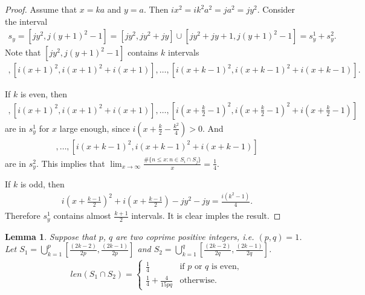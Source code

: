 \documentclass[a4paper,10pt]{amsart}
\newtheorem{lemma}{Lemma}[section]
\begin{document}
\begin{proof}
   Assume that $x = ka$ and $y = a$. Then $ix^2 = ik^2 a^2 = ja^2 = jy^2$. 
   Consider the interval 
   \begin{align*}
        s_y = [jy^2, j(y+1)^2 -1] = [jy^2, jy^2 + jy] 
        \cup [jy^2 + jy + 1, j(y+1)^2 -1] = s_{y}^{1} + s_{y}^{2}.   
   \end{align*} 
   Note that $[jy^2, j(y+1)^2-1]$ contains $k$ intervals
   \begin{align*}
       [ix^2, ix^2+ix], [i(x+1)^2, i(x+1)^2 + i(x+1)], \ldots, 
       [i(x+k-1)^2, i(x+k -1)^2+ i(x+ k-1)].
   \end{align*}

   If $k$ is even, then 
        \begin{align*}
            [ix^2, ix^2+ix], [i(x+1)^2, i(x+1)^2 + i(x+1)], \ldots, 
            [i(x+\frac{k}{2}-1)^2, i(x+\frac{k}{2} -1)^2+ i(x+ \frac{k}{2}-1)]
        \end{align*}
        are in $s_{y}^{1}$ for $x$ large enough, 
        since $i(x + \frac{k}{2} - \frac{k^2}{4}) >0$. And
            \begin{align*}
            [i(x+\frac{k}{2})^2, i(x+\frac{k}{2})^2+ i(x+ \frac{k}{2})], \ldots,
            [i(x+k-1)^2, i(x+k-1)^2+ i(x+k-1)]
        \end{align*}
        are in $s_{y}^2$. This implies that 
        $\lim_{x \rightarrow \infty} 
        \frac{\# \{n \leq x: n \in S_{i} \cap S_{j}\}}{x} = \frac{1}{4}$. 

    If $k$ is odd, then
    \begin{align*}
        i(x+\frac{k-1}{2})^2+ i(x+ \frac{k-1}{2}) -jy^2 -jy = \frac{i(k^2-1)}{4}. 
    \end{align*}
    Therefore $s_{y}^{1}$ contains almost $\frac{k+1}{2}$ intervals. It is clear
    imples the result.
\end{proof}



\begin{lemma}\label{c_lam8}
    Suppose that $p$, $q$ are two coprime positive integers, 
    i.e. $(p,q) = 1$. Let 
    $S_1 = \bigcup^{p}_{k=1}[\frac{(2k-2)}{2p}, \frac{(2k-1)}{2p}]$ and
    $S_2 = \bigcup^{q}_{k=1}[\frac{(2k-2)}{2q},\frac{(2k-1)}{2q}]$. 
    \begin{align*}
        len(S_1 \cap S_2) = 
        \begin{cases}
            \frac{1}{4} & \mbox{if $p$ or $q$ is even},\\
            \frac{1}{4} + \frac{4}{15pq} & \mbox{otherwise.}
        \end{cases}
    \end{align*}
\end{lemma}
\end{document}
